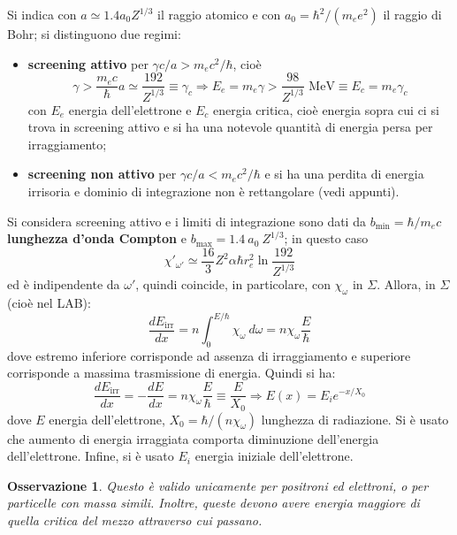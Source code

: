 \documentclass[10pt, a4paper]{scrartcl}
\numberwithin{equation}{subsection}
\theoremstyle{style1}
\newtheorem{osservazione}{Osservazione}[section]
\begin{document}
Si indica con $a\simeq 1.4 a_0 Z^{1 / 3} $ il raggio atomico e con $a_0 = \hbar ^2 / (m_e e^2)$ il raggio di Bohr; si distinguono due regimi:
\begin{itemize}
	\item \textbf{screening attivo} per $\gamma c / a > m_e c^2 / \hbar $, cio\`e
		\[
		\gamma > \frac{m_e c}{\hbar } a \simeq \frac{192}{Z^{1 / 3} }\equiv \gamma_c \Rightarrow E_e = m_e \gamma > \frac{98}{Z^{1 / 3} } \text{ MeV} \equiv E_c = m_e \gamma_c
		\] 
	con $E_e$ energia dell'elettrone e $E_c$ energia critica, cio\`e energia sopra cui ci si trova in screening attivo e si ha una notevole quantit\`a di energia persa per irraggiamento;
\item \textbf{screening non attivo} per $ \gamma c / a < m_e c^2 / \hbar $ e si ha una perdita di energia irrisoria e dominio di integrazione non \`e rettangolare (vedi appunti).
\end{itemize}
Si considera screening attivo e i limiti di integrazione sono dati da $b_\text{min} = \hbar  / m_e c$ \textbf{lunghezza d'onda Compton} e $b_\text{max} = 1.4 \ a_0\ Z^{1 / 3} $; in questo caso
\begin{equation}
	\chi '_{\omega '} \simeq \frac{16}{3} Z^2 \alpha  \hbar  r_e ^2 \ln \frac{192}{Z^{1 / 3} }
\end{equation}
ed \`e indipendente da $\omega'$, quindi coincide, in particolare, con $\chi _\omega$ in $\Sigma$. Allora, in $\Sigma$ (cio\`e nel LAB):
\begin{equation}
	\frac{d E_\text{irr}}{d x}  = n \int_{0} ^{E / \hbar } \chi _\omega \ d\omega = n \chi _\omega \frac{E}{\hbar }
\end{equation}
dove estremo inferiore corrisponde ad assenza di irraggiamento e superiore corrisponde a massima trasmissione di energia. Quindi si ha:
\begin{equation}
	\frac{d E_\text{irr}}{d x}  = -\frac{d E}{d x} = n \chi _\omega \frac{E}{\hbar }\equiv \frac{E}{X_0} \Rightarrow E(x) = E_i e^{-x / X_0} 
\end{equation}
dove $E$ energia dell'elettrone, $X_0= \hbar  / (n\chi _\omega)$ lunghezza di radiazione. Si \`e usato che aumento di energia irraggiata comporta diminuzione dell'energia dell'elettrone. Infine, si \`e usato $E_i$ energia iniziale dell'elettrone.

\begin{osservazione}
	Questo \`e valido unicamente per positroni ed elettroni, o per particelle con massa simili. Inoltre, queste devono avere energia maggiore di quella critica del mezzo attraverso cui passano.
\end{osservazione}
\end{document}
